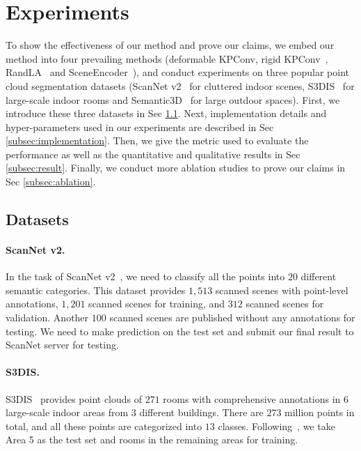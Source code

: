 \documentclass[final]{cvpr}
\begin{document}
\section{Experiments}
\label{sec:exp}
To show the effectiveness of our method and prove our claims, we embed our method into four prevailing methods (deformable KPConv, rigid KPConv~\cite{thomas2019kpconv}, RandLA~\cite{hu2020randla} and SceneEncoder~\cite{xu2020sceneencoder}), and conduct experiments on three popular point cloud segmentation datasets (ScanNet v2~\cite{dai2017scannet} for cluttered indoor scenes, S3DIS~\cite{armeni20163d} for large-scale indoor rooms and Semantic3D~\cite{hackel2017semantic3d} for large outdoor spaces). First, we introduce these three datasets in Sec \ref{subsec:datasets}. Next, implementation details and hyper-parameters used in our experiments are described in Sec \ref{subsec:implementation}. Then, we give the metric used to evaluate the performance as well as the quantitative and qualitative results in Sec \ref{subsec:result}. Finally, we conduct more ablation studies to prove our claims in Sec \ref{subsec:ablation}.

\subsection{Datasets}
\label{subsec:datasets}
\paragraph{ScanNet v2.} In the task of ScanNet v2~\cite{dai2017scannet}, we need to classify all the points into $20$ different semantic categories. This dataset provides $1,513$ scanned scenes with point-level annotations, $1,201$ scanned scenes for training, and $312$ scanned scenes for validation. Another $100$ scanned scenes are published without any annotations for testing. We need to make prediction on the test set and submit our final result to ScanNet server for testing. 

\paragraph{S3DIS.} S3DIS~\cite{armeni20163d} provides point clouds of $271$ rooms with comprehensive annotations in $6$ large-scale indoor areas from $3$ different buildings. There are $273$ million points in total, and all these points are categorized into $13$ classes.  Following~\cite{qi2017pointnet, thomas2019kpconv}, we take Area 5 as the test set and rooms in the remaining areas for training.
\end{document}
